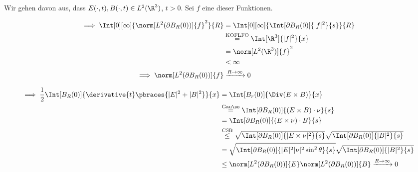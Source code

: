 \begin{solution}
\begin{enumerate}[label = (\roman*)]
    Wir gehen davon aus, dass $E(\cdot, t), B(\cdot, t) \in L^2(\R^3)$, $t > 0$.
    Sei $f$ eine dieser Funktionen.

    \begin{align*}
        \implies
        \Int[0][\infty]
        {
            \norm[L^2(\partial B_R(0))]{f}^2
        }{R}
        & =
        \Int[0][\infty]
        {
            \Int[\partial B_R(0)]{|f|^2}{s}
        }{R} \\
        & \stackrel
        {
            \mathrm{KOFLFO}
        }{=}
        \Int[\R^3]{|f|^2}{x} \\
        & =
        \norm[L^2(\R^3)]{f}^2 \\
        & <
        \infty \\
        \implies
        \norm[L^2(\partial B_R(0))]{f}
        & \xrightarrow{R \to \infty}
        0
    \end{align*}

    \begin{align*}
        \implies
        \frac{1}{2}
        \Int[B_R(0)]{\derivative{t} \pbraces{|E|^2 + |B|^2}}{x}
        & =
        \Int[B_r(0)]{\Div(E \times B)}{x} \\
        & \stackrel
        {
            \mathrm{Gauß}
        }{=}
        \Int[\partial B_R(0)]{(E \times B) \cdot \nu}{s} \\
        & =
        \Int[\partial B_R(0)]{(E \times \nu) \cdot B}{s} \\
        & \stackrel
        {
            \mathrm{CSB}
        }{\leq}
        \sqrt
        {
            \Int[\partial B_R(0)]{|E \times \nu|^2}{s}
        }
        \sqrt
        {
            \Int[\partial B_R(0)]{|B|^2}{s}
        } \\
        & =
        \sqrt
        {
            \Int[\partial B_R(0)]{|E|^2 |\nu|^2 \sin^2 \theta}{s}
        }
        \sqrt
        {
            \Int[\partial B_R(0)]{|B|^2}{s}
        } \\
        & \leq
        \norm[L^2(\partial B_R(0))]{E}
        \norm[L^2(\partial B_R(0))]{B}
        \xrightarrow{R \to \infty}
        0
    \end{align*}

\end{enumerate}
    
\end{solution}

